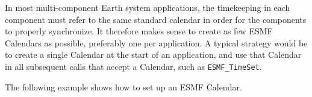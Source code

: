 
In most multi-component Earth system applications, the timekeeping in 
each component 
must refer to the same standard calendar in order for the components 
to properly synchronize.  It therefore makes sense to create as few 
ESMF Calendars as possible, preferably one per application.
A typical strategy would be to create a single Calendar at the start
of an application, and use that Calendar in all subsequent calls that
accept a Calendar, such as {\tt ESMF\_TimeSet}.

The following example shows how to set up an ESMF Calendar.  
